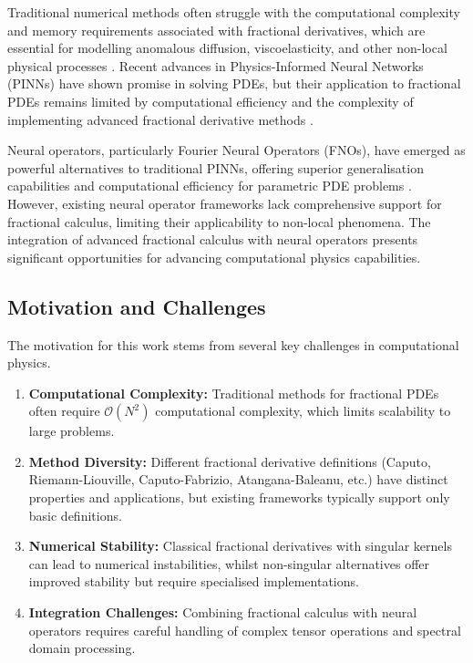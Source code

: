 \documentclass[12pt,a4paper]{article}
\theoremstyle{definition}
\begin{document}
Traditional numerical methods often struggle with the computational complexity and memory requirements associated with fractional derivatives, which are essential for modelling anomalous diffusion, viscoelasticity, and other non-local physical processes \citep{podlubny1999fractional,kilbas2006theory}. Recent advances in Physics-Informed Neural Networks (PINNs) have shown promise in solving PDEs, but their application to fractional PDEs remains limited by computational efficiency and the complexity of implementing advanced fractional derivative methods \citep{raissi2019physics,karniadakis2021physics}.

Neural operators, particularly Fourier Neural Operators (FNOs), have emerged as powerful alternatives to traditional PINNs, offering superior generalisation capabilities and computational efficiency for parametric PDE problems \citep{li2020neural,kovachki2023neural}. However, existing neural operator frameworks lack comprehensive support for fractional calculus, limiting their applicability to non-local phenomena. The integration of advanced fractional calculus with neural operators presents significant opportunities for advancing computational physics capabilities.

\subsection{Motivation and Challenges}

The motivation for this work stems from several key challenges in computational physics.

\begin{enumerate}
    \item \textbf{Computational Complexity:} Traditional methods for fractional PDEs often require $\mathcal{O}(N^2)$ computational complexity, which limits scalability to large problems.
    
    \item \textbf{Method Diversity:} Different fractional derivative definitions (Caputo, Riemann-Liouville, Caputo-Fabrizio, Atangana-Baleanu, etc.) have distinct properties and applications, but existing frameworks typically support only basic definitions.
    
    \item \textbf{Numerical Stability:} Classical fractional derivatives with singular kernels can lead to numerical instabilities, whilst non-singular alternatives offer improved stability but require specialised implementations.
    
    \item \textbf{Integration Challenges:} Combining fractional calculus with neural operators requires careful handling of complex tensor operations and spectral domain processing.
\end{enumerate}
\end{document}
